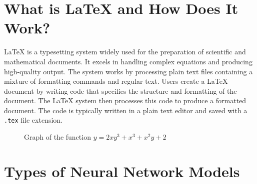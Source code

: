 \documentclass{article}
\begin{document}
\section*{What is LaTeX and How Does It Work?}

LaTeX is a typesetting system widely used for the preparation of scientific and mathematical documents. It excels in handling complex equations and producing high-quality output. The system works by processing plain text files containing a mixture of formatting commands and regular text. Users create a LaTeX document by writing code that specifies the structure and formatting of the document. The LaTeX system then processes this code to produce a formatted document. The code is typically written in a plain text editor and saved with a \texttt{.tex} file extension.

\begin{figure}[ht]
    \centering
    \caption{Graph of the function $y = 2xy^3 + x^3 + x^2y + 2$}
\end{figure}

\newpage
\section*{Types of Neural Network Models}
\end{document}
